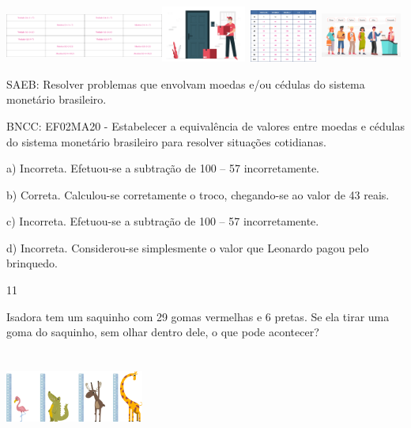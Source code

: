 \begin{escolha}
\begin{escolha}
{{{{{{{{\includegraphics[width=1.02736in,height=0.68704in]{media/image110.png}\includegraphics[width=1.02736in,height=0.68704in]{media/image110.png}\includegraphics[width=1.09268in,height=0.73073in]{media/image112.png}\includegraphics[width=1.01042in,height=0.67572in]{media/image111.png}\includegraphics[width=1.04264in,height=0.69727in]{media/image113.png}

SAEB: Resolver problemas que envolvam moedas e/ou cédulas do
sistema monetário brasileiro. 

BNCC: EF02MA20 - Estabelecer a
equivalência de valores entre moedas e cédulas do sistema monetário
brasileiro para resolver situações cotidianas.

a) Incorreta. Efetuou-se a subtração de 100 -- 57 incorretamente.

b) Correta. Calculou-se corretamente o troco, chegando-se ao valor de 43 reais.

c) Incorreta. Efetuou-se a subtração de 100 -- 57 incorretamente.

d) Incorreta. Considerou-se simplesmente o valor que Leonardo pagou pelo brinquedo.

\num{11}

Isadora tem um saquinho com 29 gomas vermelhas e 6 pretas. Se ela tirar
uma goma do saquinho, sem olhar dentro dele, o que pode acontecer?

\includegraphics[width=1.79687in,height=1.19792in]{media/image139.png}

}}}}}}}}
\end{escolha}
\end{escolha}
